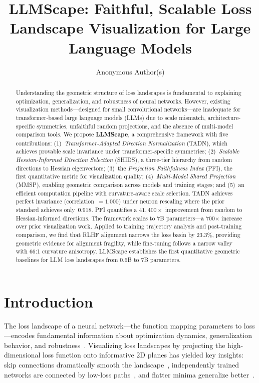 \documentclass{article}
\title{LLMScape: Faithful, Scalable Loss Landscape Visualization for Large Language Models}
\author{%
  Anonymous Author(s)
}
\begin{document}
\maketitle

\begin{abstract}
Understanding the geometric structure of loss landscapes is fundamental to explaining optimization, generalization, and robustness of neural networks. However, existing visualization methods---designed for small convolutional networks---are inadequate for transformer-based large language models (LLMs) due to scale mismatch, architecture-specific symmetries, unfaithful random projections, and the absence of multi-model comparison tools. We propose \textbf{LLMScape}, a comprehensive framework with five contributions: (1)~\emph{Transformer-Adapted Direction Normalization} (TADN), which achieves provable scale invariance under transformer-specific symmetries; (2)~\emph{Scalable Hessian-Informed Direction Selection} (SHIDS), a three-tier hierarchy from random directions to Hessian eigenvectors; (3)~the \emph{Projection Faithfulness Index} (PFI), the first quantitative metric for visualization quality; (4)~\emph{Multi-Model Shared Projection} (MMSP), enabling geometric comparison across models and training stages; and (5)~an efficient computation pipeline with curvature-aware scale selection. TADN achieves perfect invariance (correlation~$= 1.000$) under neuron rescaling where the prior standard achieves only~$0.918$. PFI quantifies a $41{,}400\times$ improvement from random to Hessian-informed directions. The framework scales to 7B parameters---a 700$\times$ increase over prior visualization work. Applied to training trajectory analysis and post-training comparison, we find that RLHF alignment narrows the loss basin by 23.3\%, providing geometric evidence for alignment fragility, while fine-tuning follows a narrow valley with 66:1 curvature anisotropy. LLMScape establishes the first quantitative geometric baselines for LLM loss landscapes from 0.6B to 7B parameters.
\end{abstract}

\section{Introduction}
\label{sec:intro}

The loss landscape of a neural network---the function mapping parameters to loss---encodes fundamental information about optimization dynamics, generalization behavior, and robustness~\citep{li2018visualizing, keskar2017on}. Visualizing loss landscapes by projecting the high-dimensional loss function onto informative 2D planes has yielded key insights: skip connections dramatically smooth the landscape~\citep{li2018visualizing}, independently trained networks are connected by low-loss paths~\citep{garipov2018loss}, and flatter minima generalize better~\citep{foret2021sharpness, liu2023same}.
\end{document}
